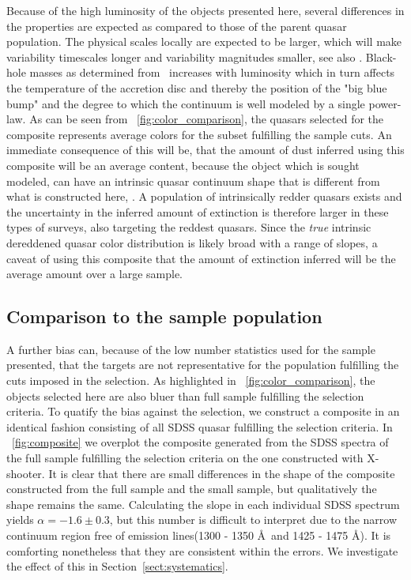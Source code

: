 \documentclass{aa}    %
\newcommand{\figref}[1]{\ref{fig:#1}}
\newcommand{\Fig}[1]{\figurename~\figref{#1}}
\newcommand{\fig}[1]{\Fig{#1}}
\newcommand{\sectionname}{Section}
\newcommand{\Sect}[1]{\sectionname~\ref{sect:#1}}
\newcommand{\sect}[1]{\Sect{#1}}
\newcommand{\sectlabel}[1]{\label{sect:#1}}
\newcommand{\mgii}{\ion{Mg}{ii}}
\begin{document}
Because of the high luminosity of the objects presented here, several differences in the properties are expected as compared to those of the parent quasar population. The physical scales locally are expected to be larger\citep{Bentz2013}, which will make variability timescales longer and variability magnitudes smaller\citep{VandenBerk2004}, see also \citet{Schmidt2012}. Black-hole masses as determined from \mgii~increases with luminosity\citep{wu2015} which in turn affects the temperature of the accretion disc\citep{shakura1973, Pereyra2006} and thereby the position of the "big blue bump" and the degree to which the continuum is well modeled by a single power-law\citep[see also][for a discussion]{Lusso2015}. As can be seen from \fig{color_comparison}, the quasars selected for the composite represents average colors for the subset fulfilling the sample cuts. An immediate consequence of this will be, that the amount of dust inferred using this composite will be an average content, because the object which is sought modeled, can have an intrinsic quasar continuum shape that is different from what is constructed here, \citep{Richards2003, Hopkins2004a}. A population of intrinsically redder quasars exists\citep{Glikman2012} and the uncertainty in the inferred amount of extinction is therefore larger in these types of surveys, also targeting the reddest quasars. 
Since the \textit{true} intrinsic dereddened quasar color distribution is likely broad with a range of slopes, a caveat of using this composite that the amount of extinction inferred will be the average amount over a large sample.



\subsection{Comparison to the sample population}  \sectlabel{sample_pop}



A further bias can, because of the low number statistics used for the sample presented, that the targets are not representative for the population fulfilling the cuts imposed in the selection. As highlighted in \fig{color_comparison}, the objects selected here are also bluer than full sample fulfilling the selection criteria. To quatify the bias against the selection, we construct a composite in an identical fashion consisting of all SDSS quasar fulfilling the selection criteria. 
In \fig{composite} we overplot the composite generated from the SDSS spectra of the full sample fulfilling the selection criteria on the one constructed with X-shooter. It is clear that there are small differences in the shape of the composite constructed from the full sample and the small sample, but qualitatively the shape remains the same. Calculating the slope in each individual SDSS spectrum yields $\alpha = -1.6\pm 0.3$, but this number is difficult to interpret due to the narrow continuum region free of emission lines(1300 - 1350 \AA~and 1425 - 1475 \AA). It is comforting nonetheless that they are consistent within the errors. We investigate the effect of this in \sect{systematics}.
\end{document}
